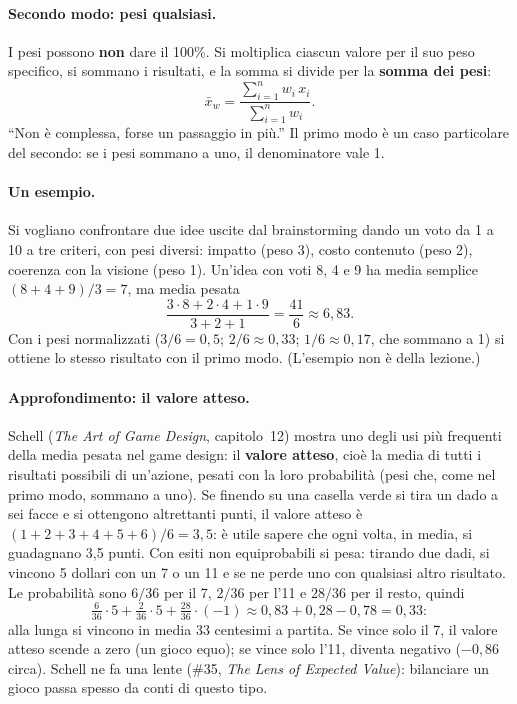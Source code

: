 \paragraph{Secondo modo: pesi qualsiasi.} I pesi possono \textbf{non} dare il
100\%. Si moltiplica ciascun valore per il suo peso specifico, si sommano i
risultati, e la somma si divide per la \textbf{somma dei pesi}:
\[
  \bar{x}_w = \frac{\sum_{i=1}^{n} w_i\, x_i}{\sum_{i=1}^{n} w_i} .
\]
``Non è complessa, forse un passaggio in più.'' Il primo modo è un caso
particolare del secondo: se i pesi sommano a uno, il denominatore vale 1.

\paragraph{Un esempio.} Si vogliano confrontare due idee uscite dal
brainstorming dando un voto da 1 a 10 a tre criteri, con pesi diversi:
impatto (peso 3), costo contenuto (peso 2), coerenza con la visione
(peso 1). Un'idea con voti 8, 4 e 9 ha media semplice $(8+4+9)/3 = 7$, ma
media pesata
\[
  \frac{3\cdot 8 + 2\cdot 4 + 1\cdot 9}{3+2+1} = \frac{41}{6} \approx 6{,}83 .
\]
Con i pesi normalizzati ($3/6 = 0{,}5$; $2/6 \approx 0{,}33$;
$1/6 \approx 0{,}17$, che sommano a 1) si ottiene lo stesso risultato con il
primo modo. (L'esempio non è della lezione.)

\paragraph{Approfondimento: il valore atteso.} Schell (\emph{The Art of Game
Design}, capitolo~12) mostra uno degli usi più frequenti della media pesata
nel game design: il \textbf{valore atteso}, cioè la media di tutti i
risultati possibili di un'azione, pesati con la loro probabilità (pesi che,
come nel primo modo, sommano a uno). Se finendo su una casella verde si tira
un dado a sei facce e si ottengono altrettanti punti, il valore atteso è
$(1+2+3+4+5+6)/6 = 3{,}5$: è utile sapere che ogni volta, in media, si
guadagnano 3,5 punti. Con esiti non equiprobabili si pesa: tirando due dadi,
si vincono 5 dollari con un 7 o un 11 e se ne perde uno con qualsiasi altro
risultato. Le probabilità sono $6/36$ per il 7, $2/36$ per l'11 e $28/36$ per
il resto, quindi
\[
  \tfrac{6}{36}\cdot 5 + \tfrac{2}{36}\cdot 5 + \tfrac{28}{36}\cdot(-1)
  \approx 0{,}83 + 0{,}28 - 0{,}78 = 0{,}33 :
\]
alla lunga si vincono in media 33 centesimi a partita. Se vince solo il 7, il
valore atteso scende a zero (un gioco equo); se vince solo l'11, diventa
negativo ($-0{,}86$ circa). Schell ne fa una lente (\#35, \emph{The Lens of
Expected Value}): bilanciare un gioco passa spesso da conti di questo tipo.

